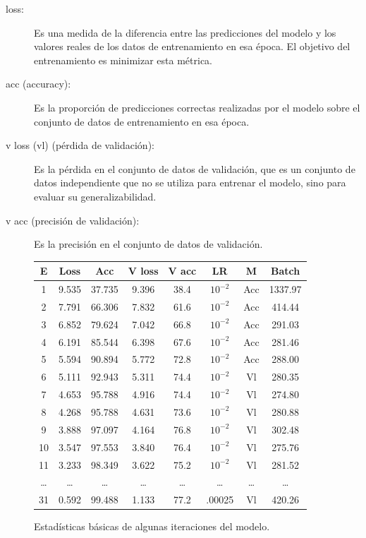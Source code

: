     \begin{description}
       \item [loss:] Es una medida de la diferencia entre las predicciones del modelo y los valores reales de los datos de entrenamiento en esa época. El objetivo del entrenamiento es minimizar esta métrica.
       \item [acc (accuracy):] Es la proporción de predicciones correctas realizadas por el modelo sobre el conjunto de datos de entrenamiento en esa época.
       \item [v loss (vl) (pérdida de validación):] Es la pérdida en el conjunto de datos de validación, que es un conjunto de datos independiente que no se utiliza para entrenar el modelo, sino para evaluar su generalizabilidad.
       \item [v acc (precisión de validación):] Es la precisión en el conjunto de datos de validación.
    \end{description}
\begin{figure}[ht]
        \small
        \begin{center}
            \begin{tabular}{|c|c|c|c|c|c|c|c|} \hline
            E  & Loss  & Acc & V loss & V acc & LR             & M & Batch \\ \hline
            1  & 9.535 & 37.735   & 9.396  & 38.4  & $10^{-2}$ & Acc     & 1337.97 \\ \hline
            2  & 7.791 & 66.306   & 7.832  & 61.6  & $10^{-2}$ & Acc     & 414.44 \\ \hline
            3  & 6.852 & 79.624   & 7.042  & 66.8  & $10^{-2}$ & Acc     & 291.03 \\ \hline
            4  & 6.191 & 85.544   & 6.398  & 67.6  & $10^{-2}$ & Acc     & 281.46 \\ \hline
            5  & 5.594 & 90.894   & 5.772  & 72.8  & $10^{-2}$ & Acc     & 288.00 \\ \hline
            6  & 5.111 & 92.943   & 5.311  & 74.4  & $10^{-2}$ & Vl  & 280.35 \\ \hline
            7  & 4.653 & 95.788   & 4.916  & 74.4  & $10^{-2}$ & Vl  & 274.80 \\ \hline
            8  & 4.268 & 95.788   & 4.631  & 73.6  & $10^{-2}$ & Vl  & 280.88 \\ \hline
            9  & 3.888 & 97.097   & 4.164  & 76.8  & $10^{-2}$ & Vl  & 302.48 \\ \hline
            10 & 3.547 & 97.553   & 3.840  & 76.4  & $10^{-2}$ & Vl  & 275.76 \\ \hline
            11 & 3.233 & 98.349   & 3.622  & 75.2  & $10^{-2}$ & Vl  & 281.52 \\ \hline
            \dots   & \dots   & \dots      & \dots    & \dots   & \dots    & \dots     & \dots \\ \hline
            31 & 0.592 & 99.488   & 1.133  & 77.2  & .00025 & Vl  & 420.26 \\ \hline
            \end{tabular}
            \caption{Estadísticas básicas de algunas iteraciones del modelo.}
        \end{center}\label{fig:modelo}
    \end{figure}
    
